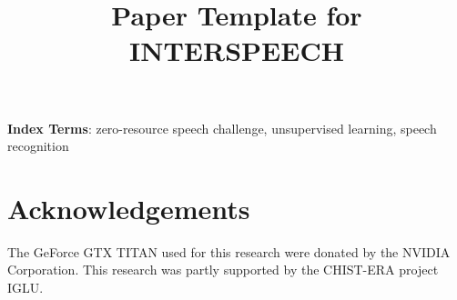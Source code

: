 \documentclass[a4paper]{article}
\title{Paper Template for INTERSPEECH}
\begin{document}
\maketitle
% 
\begin{abstract}

\end{abstract}
\noindent\textbf{Index Terms}: zero-resource speech challenge, unsupervised learning, speech recognition







\section{Acknowledgements}
The GeForce GTX TITAN used for this research were donated by the NVIDIA Corporation. This research was partly supported by the CHIST-ERA project IGLU.

\printbibliography[heading=bibnumbered]
%

%
\end{document}
